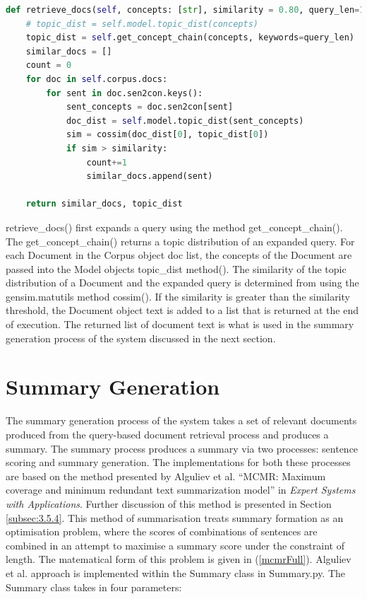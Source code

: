 \begin{lstlisting}[language=Python]
def retrieve_docs(self, concepts: [str], similarity = 0.80, query_len=10):
    # topic_dist = self.model.topic_dist(concepts)
    topic_dist = self.get_concept_chain(concepts, keywords=query_len)
    similar_docs = []
    count = 0
    for doc in self.corpus.docs:
        for sent in doc.sen2con.keys():
            sent_concepts = doc.sen2con[sent]
            doc_dist = self.model.topic_dist(sent_concepts)
            sim = cossim(doc_dist[0], topic_dist[0])
            if sim > similarity:
                count+=1
                similar_docs.append(sent)
    
    return similar_docs, topic_dist
\end{lstlisting}
retrieve\_docs() first expands a query using the method get\_concept\_chain(). The get\_concept\_chain() returns a topic distribution of an expanded query. For each Document in the Corpus object doc list, the concepts of the Document are passed into the Model objects topic\_dist method(). The similarity of the topic distribution of a Document and the expanded query is determined from using the gensim.matutils method cossim(). If the similarity is greater than the similarity threshold, the Document object text is added to a list that is returned at the end of execution. The returned list of document text is what is used in the summary generation process of the system discussed in the next section.

\section{Summary Generation}
The summary generation process of the system takes a set of relevant documents produced from the query-based document retrieval process and produces a summary. The summary process produces a summary via two processes: sentence scoring and summary generation. The implementations for both these processes are based on the method presented by Alguliev et al. \citeyear{alguliev2011mcmr} “MCMR: Maximum coverage and minimum redundant text summarization model” in \emph{Expert Systems with Applications}. Further discussion of this method is presented in Section \ref{subsec:3.5.4}. This method of summarisation treats summary formation as an optimisation problem, where the scores of combinations of sentences are combined in an attempt to maximise a summary score under the constraint of length. The matematical form of this problem is given in (\ref{mcmrFull}). Alguliev et al. approach is implemented within the Summary class in Summary.py. The Summary class takes in four parameters:

